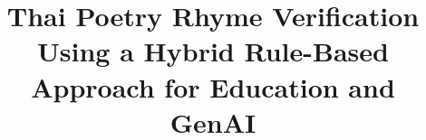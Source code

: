 \documentclass[conference]{IEEEtran}
\begin{document}
\title{Thai Poetry Rhyme Verification Using a Hybrid Rule-Based Approach for Education and GenAI}

\end{document}
